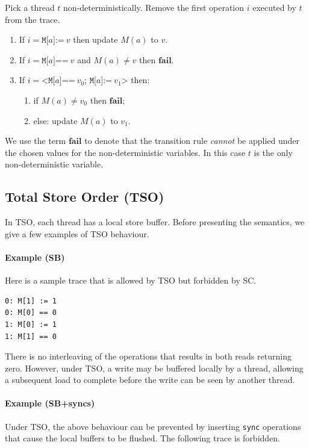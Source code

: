 \documentclass[11pt]{article}
\begin{document}
Pick a thread $t$ non-deterministically.  Remove the first operation
$i$ executed by $t$ from the trace.

\begin{enumerate}
\item
     If $i = \texttt{M[}a\texttt{]:=}~v$ then update $M(a)$ to $v$.

\item
     If $i = \texttt{M[}a\texttt{]==}~v$ and $M(a) \neq v$
     then $\textbf{fail}$.

\item
     If $i = \texttt{<M[}a\texttt{]==}~v_0\texttt{; M[}a\texttt{]:=}~v_1
     \texttt{>}$ then:

\begin{enumerate}[i]
\item
          if $M(a) \neq v_0$ then $\textbf{fail}$;
\item
          else: update $M(a)$ to $v_1$.
\end{enumerate}
\end{enumerate}

\noindent We use the term $\textbf{fail}$ to denote that the
transition rule \emph{cannot} be applied under the chosen values for
the non-deterministic variables.  In this case $t$ is the only
non-deterministic variable.  

\subsection{Total Store Order (TSO)}

In TSO, each thread has a local store buffer.  Before presenting the
semantics, we give a few examples of TSO behaviour.

\paragraph{Example (SB)} Here is a sample trace that is allowed by
TSO but forbidden by SC.

\begin{verbatim}
0: M[1] := 1
0: M[0] == 0
1: M[0] := 1
1: M[1] == 0
\end{verbatim}

\noindent There is no interleaving of the operations that results in both reads
returning zero.  However, under TSO, a write may be buffered locally
by a thread, allowing a subsequent load to complete before the write
can be seen by another thread.

\paragraph{Example (SB+syncs)}  Under TSO, the above behaviour can be
prevented by inserting \verb!sync! operations that cause the local
buffers to be flushed.  The following trace is forbidden.
\end{document}
